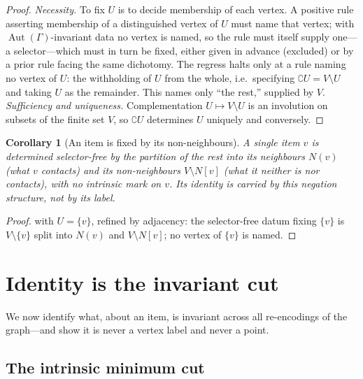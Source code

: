 \documentclass[11pt,a4paper]{article}
\theoremstyle{thmstyle}
\newtheorem{corollary}[theorem]{Corollary}
\theoremstyle{definition}
\theoremstyle{remark}
\newcommand{\Gph}{\Gamma}
\newcommand{\V}{V}
\newcommand{\co}{\complement}
\begin{document}
\begin{proof}
\emph{Necessity.} To fix $U$ is to decide membership of each vertex. A
positive rule asserting membership of a distinguished vertex of $U$ must
name that vertex; with $\operatorname{Aut}(\Gph)$-invariant data no vertex
is named, so the rule must itself supply one---a selector---which must in
turn be fixed, either given in advance (excluded) or by a prior rule
facing the same dichotomy. The regress halts only at a rule naming no
vertex of $U$: the withholding of $U$ from the whole, i.e.\ specifying
$\co U=\V\setminus U$ and taking $U$ as the remainder. This names only
``the rest,'' supplied by $\V$. \emph{Sufficiency and uniqueness.}
Complementation $U\mapsto\V\setminus U$ is an involution on subsets of the
finite set $\V$, so $\co U$ determines $U$ uniquely and conversely.
\end{proof}

\begin{corollary}[An item is fixed by its non-neighbours]
\label{cor:vertex-negation}
A single item $v$ is determined selector-free by the partition of the rest
into its neighbours $N(v)$ (what $v$ contacts) and its non-neighbours
$\V\setminus N[v]$ (what it neither is nor contacts), with no intrinsic
mark on $v$. Its identity is carried by this negation structure, not by
its label.
\end{corollary}

\begin{proof}
 with $U=\{v\}$, refined by adjacency: the
selector-free datum fixing $\{v\}$ is $\V\setminus\{v\}$ split into
$N(v)$ and $\V\setminus N[v]$; no vertex of $\{v\}$ is named.
\end{proof}

\section{Identity is the invariant cut}
\label{sec:identity}

We now identify what, about an item, is invariant across all re-encodings
of the graph---and show it is never a vertex label and never a point.

\subsection{The intrinsic minimum cut}
\end{document}
